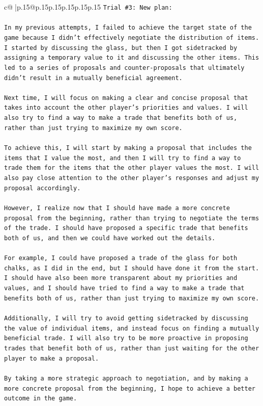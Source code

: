 \documentclass{article}
\begin{document}
{\begin{supertabular}{c@{$\;$}|p{.15\linewidth}@{}p{.15\linewidth}p{.15\linewidth}p{.15\linewidth}p{.15\linewidth}p{.15\linewidth}}
{{{\texttt{Trial \#3: New plan: } \\
\\ 
\texttt{In my previous attempts, I failed to achieve the target state of the game because I didn't effectively negotiate the distribution of items. I started by discussing the glass, but then I got sidetracked by assigning a temporary value to it and discussing the other items. This led to a series of proposals and counter{-}proposals that ultimately didn't result in a mutually beneficial agreement.} \\
\\ 
\texttt{Next time, I will focus on making a clear and concise proposal that takes into account the other player's priorities and values. I will also try to find a way to make a trade that benefits both of us, rather than just trying to maximize my own score.} \\
\\ 
\texttt{To achieve this, I will start by making a proposal that includes the items that I value the most, and then I will try to find a way to trade them for the items that the other player values the most. I will also pay close attention to the other player's responses and adjust my proposal accordingly.} \\
\\ 
\texttt{However, I realize now that I should have made a more concrete proposal from the beginning, rather than trying to negotiate the terms of the trade. I should have proposed a specific trade that benefits both of us, and then we could have worked out the details.} \\
\\ 
\texttt{For example, I could have proposed a trade of the glass for both chalks, as I did in the end, but I should have done it from the start. I should have also been more transparent about my priorities and values, and I should have tried to find a way to make a trade that benefits both of us, rather than just trying to maximize my own score.} \\
\\ 
\texttt{Additionally, I will try to avoid getting sidetracked by discussing the value of individual items, and instead focus on finding a mutually beneficial trade. I will also try to be more proactive in proposing trades that benefit both of us, rather than just waiting for the other player to make a proposal.} \\
\\ 
\texttt{By taking a more strategic approach to negotiation, and by making a more concrete proposal from the beginning, I hope to achieve a better outcome in the game.} \\
}}}
\end{supertabular}}
\end{document}
